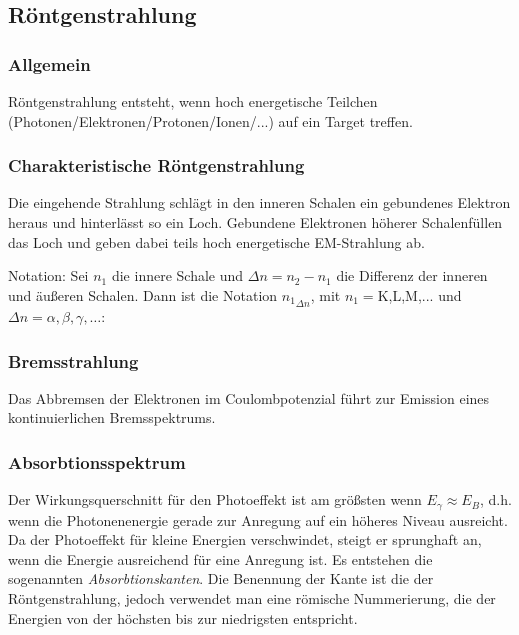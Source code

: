 \documentclass[twocolumn]{summery_4.1}
\begin{document}
\subsection{Röntgenstrahlung}
\subsubsection{Allgemein}
Röntgenstrahlung entsteht, wenn hoch energetische Teilchen (Photonen/Elektronen/Protonen/Ionen/...) auf ein Target treffen. 
\subsubsection{Charakteristische Röntgenstrahlung}
Die eingehende Strahlung schlägt in den inneren Schalen ein gebundenes Elektron heraus und hinterlässt so ein Loch. Gebundene Elektronen höherer Schalenfüllen das Loch und geben dabei teils hoch energetische EM-Strahlung ab.
\begin{figure}[H]
    \centering
    
\end{figure}
Notation: Sei \(n_1\) die innere Schale und \(\Delta n = n_2 -n_1\) die Differenz der inneren und äußeren Schalen. Dann ist die Notation \({n_1}_{\Delta n}\), mit \(n_1=\)K,L,M,... und \(\Delta n=\alpha,\beta,\gamma,\dots\):  
\begin{figure}[H]
    \centering
    
\end{figure}

\subsubsection{Bremsstrahlung}
Das Abbremsen der Elektronen im Coulombpotenzial führt zur Emission eines kontinuierlichen Bremsspektrums.

\begin{figure}[H]
    \centering
    
\end{figure}

\subsubsection{Absorbtionsspektrum}
Der Wirkungsquerschnitt für den Photoeffekt ist am größsten wenn \(E_\gamma \approx E_B\), d.h. wenn die Photonenenergie gerade zur Anregung auf ein höheres Niveau ausreicht. Da der Photoeffekt für kleine Energien verschwindet, steigt er sprunghaft an, wenn die Energie ausreichend für eine Anregung ist. Es entstehen die sogenannten \emph{Absorbtionskanten}.
Die Benennung der Kante ist die der Röntgenstrahlung, jedoch verwendet man eine römische Nummerierung, die der Energien von der höchsten bis zur niedrigsten entspricht. 
\end{document}

